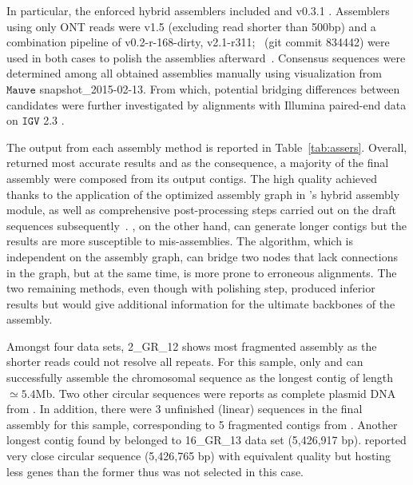 In particular, the enforced hybrid assemblers included \npscarf{} and \unicycler{} v0.3.1 \cite{Wick2017unicycler}. Assemblers using only ONT reads were \canu{} v1.5 \cite{Koren2017canu} (excluding read shorter than 500bp) and a combination pipeline of \miniasm{} v0.2-r-168-dirty, \minimap{} v2.1-r311; \racon{}~(git commit 834442) were used in both cases to polish the assemblies afterward~\cite{Vaser2017racon}. Consensus sequences were determined among all obtained assemblies manually using visualization from $\mathtt{Mauve}$ \cite{Darling2011mauve} snapshot\_2015-02-13. 
From which, potential bridging differences between candidates were further investigated by alignments with Illumina paired-end data on $\mathtt{IGV}$ 2.3 \cite{Robinson2011IGV,Thorvaldsdottir2013IGV}. 

The output from each assembly method is reported in Table~\ref{tab:assers}. 
Overall, \unicycler{} returned most accurate results and as the consequence, a majority of the final assembly were composed from its output contigs. The high quality achieved thanks to the application of the optimized assembly graph in \unicycler{}'s hybrid assembly module, as well as comprehensive post-processing steps carried out on the draft sequences subsequently~\cite{Wick2017unicycler}. 
\npscarf{}, on the other hand, can generate longer contigs but the results are more susceptible to mis-assemblies. The algorithm, which is independent on the assembly graph, can bridge two nodes that lack connections in the graph, but at the same time, is more prone to erroneous alignments. 
The two remaining methods, even though with polishing step, produced inferior results but would give additional information for the ultimate backbones of the assembly.

Amongst four data sets, 2\_GR\_12 shows most fragmented assembly as the shorter reads could not resolve all repeats. For this sample, only \npscarf{} and \canu{} can successfully assemble the chromosomal sequence as the longest contig of length $\simeq 5.4$Mb. Two other circular sequences were reports as complete plasmid DNA from \unicycler{}. In addition, there were 3 unfinished (linear) sequences in the final assembly for this sample, corresponding to 5 fragmented contigs from \unicycler{}. Another longest contig found by \npscarf{} belonged to 16\_GR\_13 data set (5,426,917 bp). \unicycler{} reported very close circular sequence (5,426,765 bp) with equivalent quality but hosting less genes than the former thus was not selected in this case. %

